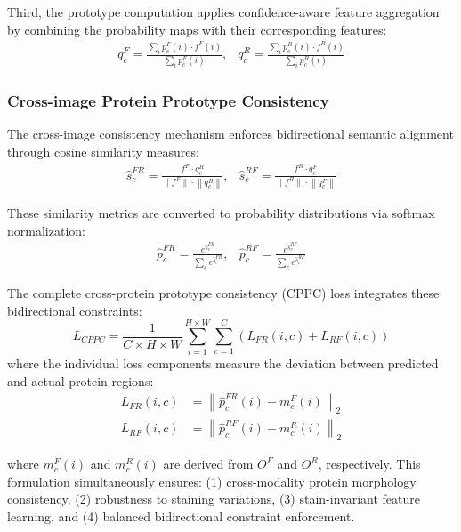 \documentclass[journal,twoside,web]{ieeecolor}
\begin{document}
Third, the prototype computation applies confidence-aware feature aggregation by combining the probability maps with their corresponding features:
\begin{align}
    {q}_c^{{F}}=\frac{\sum_i p_c^F(i)\cdot f^F(i)}{\sum_i p_c^F(i)} ,
    & {q}_c^{{R}}=\frac{\sum_i p_c^R(i)\cdot f^R(i)}{\sum_i p_c^R(i)} 
\end{align}

\subsubsection{Cross-image Protein Prototype Consistency}
The cross-image consistency mechanism enforces bidirectional semantic alignment through cosine similarity measures:
\begin{align}
    \hat{s}_{c}^{FR}=\frac{f^F\cdot{q}_c^R}{\|f^F\|\cdot\left\|{q}_c^R\right\|},
    & \hat{s}_{c}^{RF}=\frac{f^R\cdot{q}_c^F}{\|f^R\|\cdot\left\|{q}_c^F\right\|}
\end{align}

These similarity metrics are converted to probability distributions via softmax normalization:
\begin{align}
    \hat{p}_c^{FR} =\frac{e^{\hat{s}_{c}^{FR}}}{\sum_{c}e^{\hat{s}_{c}^{FR}}},
    & \hat{p}_c^{RF} = \frac{e^{\hat{s}_{c}^{RF}}}{\sum_{c}e^{\hat{s}_{c}^{RF}}}
\end{align}

{The complete cross-protein prototype consistency (CPPC) loss integrates these bidirectional constraints}:
\begin{equation}
L_{CPPC} = \frac{1}{C \times H \times W} \sum_{i=1}^{H \times W} \sum_{c=1}^{C} \left( L_{FR}(i, c) + L_{RF}(i, c) \right)
\end{equation}
where the individual loss components measure the deviation between predicted and actual protein regions:
\begin{align*}
L_{FR}(i, c) &= \left\| \hat{p}_c^{FR}(i) - m_c^F(i) \right\|_{2} \\
L_{RF}(i, c) &= \left\| \hat{p}_c^{RF}(i) - m_c^R(i) \right\|_{2}
\end{align*}

\noindent where $m_c^F(i)$ and $ m_c^R(i)$ are derived from $O^F$ and $O^R$, respectively. This formulation simultaneously ensures: (1) cross-modality protein morphology consistency, (2) robustness to staining variations, (3) stain-invariant feature learning, and (4) balanced bidirectional constraint enforcement.
\end{document}
